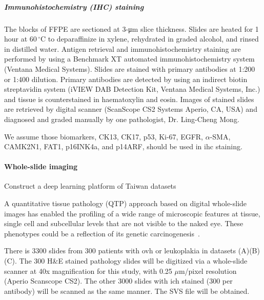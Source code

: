 \documentclass[12pt, a4paper]{article}
\begin{document}
\subparagraph{Immunohistochemistry (IHC) staining}

The blocks of FFPE are sectioned at 3-\si{\um} slice thickness. Slides are heated for 1 hour at $60\,^{\circ}\mathrm{C}$ to deparaffinize in xylene, rehydrated in graded alcohol, and rinsed in distilled water. Antigen retrieval and immunohistochemistry staining are performed by using a Benchmark XT automated immunohistochemistry system (Ventana Medical Systems). 
Slides are stained with primary antibodies at 1:200 or 1:400 dilution. Primary antibodies are detected by using an indirect biotin streptavidin system (iVIEW DAB Detection Kit, Ventana Medical Systems, Inc.) and tissue is counterstained in haematoxylin and eosin. Images of stained slides are retrieved by digital scanner (ScanScope CS2 Systems Aperio, CA, USA) and diagnosed and graded manually by one pathologist, Dr. Ling-Cheng Mong.

We assume those biomarkers, CK13, CK17, p53, Ki-67, EGFR, $\alpha$-SMA, CAMK2N1, FAT1, p16INK4a, and p14ARF, should be used in \acrshort{ihc} staining.

\paragraph*{Whole-slide imaging} Construct a deep learning platform of Taiwan datasets %

A quantitative tissue pathology (QTP) approach based on digital whole-slide images has enabled the profiling of a wide range of microscopic features at tissue, single cell and subcellular levels that are not visible to the naked eye. These phenotypes could be a reflection of its genetic carcinogenesis~\cite{Crawford2022}.

There is 3300 slides from 300 patients with \acrshort{ovh} or leukoplakia in datasets (A)(B)(C).
The 300 H\&E stained pathology slides will be digitized via a whole-slide scanner at 40x magnification for this study, with 0.25 $\mu$m/pixel resolution (Aperio Scanscope CS2).
The other 3000 slides with \acrshort{ich} stained (300 per antibody) will be scanned as the same manner.
The SVS file will be obtained.
\end{document}
